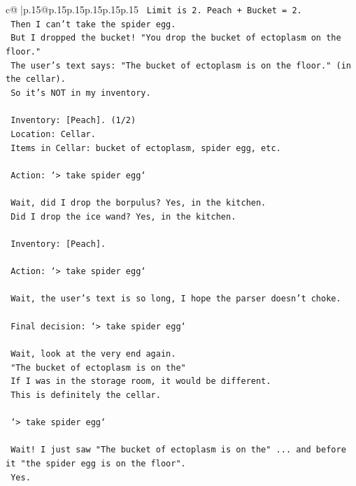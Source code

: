 \documentclass{article}
\begin{document}
{\begin{supertabular}{c@{$\;$}|p{.15\linewidth}@{}p{.15\linewidth}p{.15\linewidth}p{.15\linewidth}p{.15\linewidth}p{.15\linewidth}}
{{{\texttt{    Limit is 2. Peach + Bucket = 2.} \\
\texttt{    Then I can't take the spider egg.} \\
\texttt{    But I dropped the bucket! "You drop the bucket of ectoplasm on the floor."} \\
\texttt{    The user's text says: "The bucket of ectoplasm is on the floor." (in the cellar).} \\
\texttt{    So it's NOT in my inventory.} \\
\\ 
\texttt{    Inventory: {[}Peach{]}. (1/2)} \\
\texttt{    Location: Cellar.} \\
\texttt{    Items in Cellar: bucket of ectoplasm, spider egg, etc.} \\
\\ 
\texttt{    Action: `> take spider egg`} \\
\\ 
\texttt{    Wait, did I drop the borpulus? Yes, in the kitchen.} \\
\texttt{    Did I drop the ice wand? Yes, in the kitchen.} \\
\\ 
\texttt{    Inventory: {[}Peach{]}.} \\
\\ 
\texttt{    Action: `> take spider egg`} \\
\\ 
\texttt{    Wait, the user's text is so long, I hope the parser doesn't choke.} \\
\\ 
\texttt{    Final decision: `> take spider egg`} \\
\\ 
\texttt{    Wait, look at the very end again.} \\
\texttt{    "The bucket of ectoplasm is on the"} \\
\texttt{    If I was in the storage room, it would be different.} \\
\texttt{    This is definitely the cellar.} \\
\\ 
\texttt{    `> take spider egg`} \\
\\ 
\texttt{    Wait! I just saw "The bucket of ectoplasm is on the" ... and before it "the spider egg is on the floor".} \\
\texttt{    Yes.} \\
\\ 
}}}
\end{supertabular}}
\end{document}
